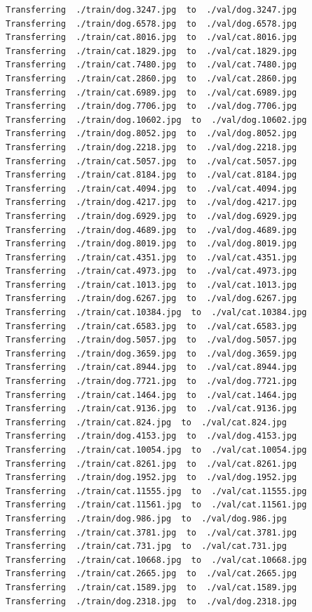 \documentclass[]{book}
\theoremstyle{definition}
\theoremstyle{definition}
\theoremstyle{definition}
\theoremstyle{remark}
\begin{document}
\begin{verbatim}
Transferring  ./train/dog.3247.jpg  to  ./val/dog.3247.jpg
Transferring  ./train/dog.6578.jpg  to  ./val/dog.6578.jpg
Transferring  ./train/cat.8016.jpg  to  ./val/cat.8016.jpg
Transferring  ./train/cat.1829.jpg  to  ./val/cat.1829.jpg
Transferring  ./train/cat.7480.jpg  to  ./val/cat.7480.jpg
Transferring  ./train/cat.2860.jpg  to  ./val/cat.2860.jpg
Transferring  ./train/cat.6989.jpg  to  ./val/cat.6989.jpg
Transferring  ./train/dog.7706.jpg  to  ./val/dog.7706.jpg
Transferring  ./train/dog.10602.jpg  to  ./val/dog.10602.jpg
Transferring  ./train/dog.8052.jpg  to  ./val/dog.8052.jpg
Transferring  ./train/dog.2218.jpg  to  ./val/dog.2218.jpg
Transferring  ./train/cat.5057.jpg  to  ./val/cat.5057.jpg
Transferring  ./train/cat.8184.jpg  to  ./val/cat.8184.jpg
Transferring  ./train/cat.4094.jpg  to  ./val/cat.4094.jpg
Transferring  ./train/dog.4217.jpg  to  ./val/dog.4217.jpg
Transferring  ./train/dog.6929.jpg  to  ./val/dog.6929.jpg
Transferring  ./train/dog.4689.jpg  to  ./val/dog.4689.jpg
Transferring  ./train/dog.8019.jpg  to  ./val/dog.8019.jpg
Transferring  ./train/cat.4351.jpg  to  ./val/cat.4351.jpg
Transferring  ./train/cat.4973.jpg  to  ./val/cat.4973.jpg
Transferring  ./train/cat.1013.jpg  to  ./val/cat.1013.jpg
Transferring  ./train/dog.6267.jpg  to  ./val/dog.6267.jpg
Transferring  ./train/cat.10384.jpg  to  ./val/cat.10384.jpg
Transferring  ./train/cat.6583.jpg  to  ./val/cat.6583.jpg
Transferring  ./train/dog.5057.jpg  to  ./val/dog.5057.jpg
Transferring  ./train/dog.3659.jpg  to  ./val/dog.3659.jpg
Transferring  ./train/cat.8944.jpg  to  ./val/cat.8944.jpg
Transferring  ./train/dog.7721.jpg  to  ./val/dog.7721.jpg
Transferring  ./train/cat.1464.jpg  to  ./val/cat.1464.jpg
Transferring  ./train/cat.9136.jpg  to  ./val/cat.9136.jpg
Transferring  ./train/cat.824.jpg  to  ./val/cat.824.jpg
Transferring  ./train/dog.4153.jpg  to  ./val/dog.4153.jpg
Transferring  ./train/cat.10054.jpg  to  ./val/cat.10054.jpg
Transferring  ./train/cat.8261.jpg  to  ./val/cat.8261.jpg
Transferring  ./train/dog.1952.jpg  to  ./val/dog.1952.jpg
Transferring  ./train/cat.11555.jpg  to  ./val/cat.11555.jpg
Transferring  ./train/cat.11561.jpg  to  ./val/cat.11561.jpg
Transferring  ./train/dog.986.jpg  to  ./val/dog.986.jpg
Transferring  ./train/cat.3781.jpg  to  ./val/cat.3781.jpg
Transferring  ./train/cat.731.jpg  to  ./val/cat.731.jpg
Transferring  ./train/cat.10668.jpg  to  ./val/cat.10668.jpg
Transferring  ./train/cat.2665.jpg  to  ./val/cat.2665.jpg
Transferring  ./train/cat.1589.jpg  to  ./val/cat.1589.jpg
Transferring  ./train/dog.2318.jpg  to  ./val/dog.2318.jpg

\end{verbatim}
\end{document}
